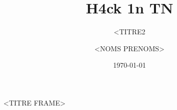 \documentclass{beamer}
\title[<TITRE1>]{H4ck 1n TN}
\subtitle{<TITRE2}
\author[H4ck1nTN]{<NOMS PRENOMS>}
\institute[HiT]{Ceten -- TELECOM Nancy}
\date{\today}
\begin{document}
\begin{frame}
\titlepage
\end{frame} 


\begin{frame}{<TITRE FRAME>}
\end{frame}
\end{document}
